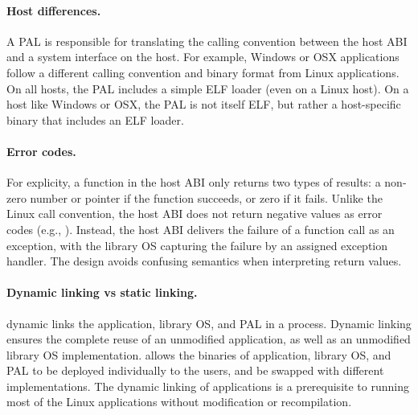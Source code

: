 



\paragraph{Host differences.}
A PAL is responsible for translating the calling convention between the host ABI and a system interface on the host.
For example,
Windows or OSX applications follow a different calling convention and binary format
from Linux applications.
On all hosts, the PAL includes a simple ELF loader (even on a Linux host).
On a host like Windows or OSX, the PAL is not itself ELF,
but rather a host-specific binary that includes an ELF loader.




\paragraph{Error codes.}
For explicity, a function in the host ABI only returns two types of results:
a non-zero number or pointer if the function succeeds, or zero if it fails.
Unlike the Linux call convention, the host ABI does not return negative values as error codes (e.g., ).
Instead, the host ABI delivers the failure of a function call
as an exception, with the library OS capturing the failure by an assigned exception handler.
The design avoids confusing semantics
when interpreting return values.



\paragraph{Dynamic linking vs static linking.}
\graphene{} dynamic links the application, library OS, and PAL
in a process.
Dynamic linking ensures the complete reuse of an unmodified application,
as well as an unmodified library OS implementation.
\graphene{} allows the binaries of application, library OS, and PAL to be deployed individually to the users,
and be swapped with different implementations.
The dynamic linking of applications is a prerequisite
to running most of the Linux applications without modification or recompilation.



